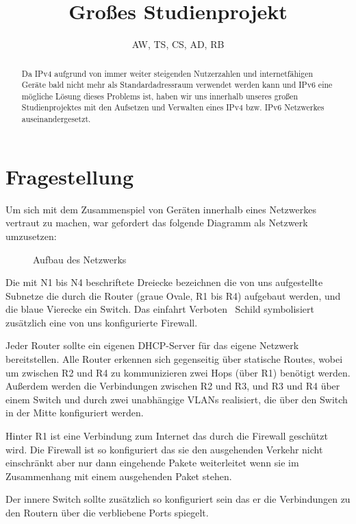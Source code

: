 \documentclass[10pt,a4paper]{article}
\author{AW, TS, CS, AD, RB}
\title{Großes Studienprojekt}
\begin{document}
	\maketitle
	\begin{abstract}
		Da IPv4 aufgrund von immer weiter steigenden Nutzerzahlen und internetfähigen Geräte bald nicht mehr als Standardadressraum verwendet werden kann und IPv6 eine mögliche Lösung dieses Problems ist, haben wir uns innerhalb unseres großen Studienprojektes  mit den Aufsetzen und Verwalten eines IPv4 bzw. IPv6 Netzwerkes auseinandergesetzt. 
	\end{abstract}
	\section{Fragestellung}
	Um sich mit dem Zusammenspiel von Geräten innerhalb eines Netzwerkes vertraut zu machen, war gefordert das folgende Diagramm als Netzwerk umzusetzen:
	\begin{figure}[ht]
		\centering
		\caption{Aufbau des Netzwerks}
	\end{figure}
\par
	Die mit N1 bis N4 beschriftete Dreiecke bezeichnen die von uns aufgestellte Subnetze die durch die Router (graue Ovale, R1 bis R4) aufgebaut werden, und die blaue Vierecke ein Switch. Das \glqq einfahrt Verboten\grqq~ Schild symbolisiert zusätzlich eine von uns konfigurierte Firewall.
\par
	Jeder Router sollte ein eigenen DHCP-Server für das eigene Netzwerk bereitstellen. Alle Router erkennen sich gegenseitig über statische Routes, wobei um zwischen R2 und R4 zu kommunizieren zwei Hops (über R1) benötigt werden. Außerdem werden die Verbindungen zwischen R2 und R3, und R3 und R4 über einem Switch und durch zwei unabhängige VLANs realisiert, die über den Switch in der Mitte konfiguriert werden.
\par
	Hinter R1 ist eine Verbindung zum Internet das durch die Firewall geschützt wird. Die Firewall ist so konfiguriert das sie den ausgehenden Verkehr nicht einschränkt aber nur dann eingehende Pakete weiterleitet wenn sie im Zusammenhang mit einem ausgehenden Paket stehen.
\par
	Der innere Switch sollte zusätzlich so konfiguriert sein das er die Verbindungen zu den Routern über die verbliebene Ports spiegelt.
	
\end{document}
